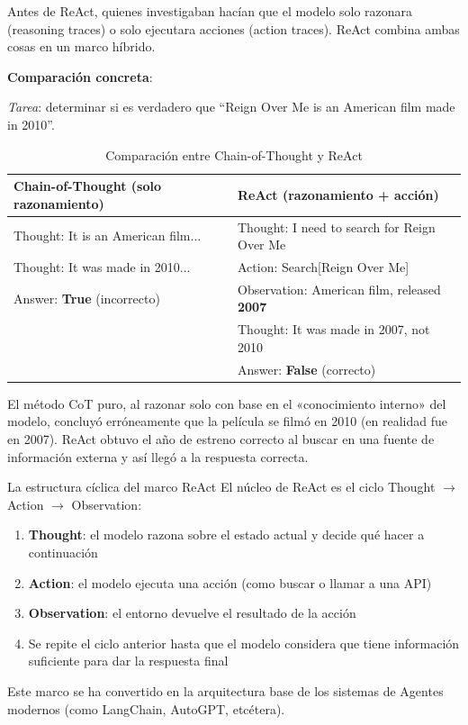 \documentclass[a4paper]{article}
\begin{document}
Antes de ReAct, quienes investigaban hacían que el modelo solo razonara (reasoning traces) o solo ejecutara acciones (action traces). ReAct combina ambas cosas en un marco híbrido.

\textbf{Comparación concreta}:

\textit{Tarea}: determinar si es verdadero que ``Reign Over Me is an American film made in 2010''.

\begin{table}[H]
\centering
\begin{tabular}{p{6cm}p{6cm}}
\toprule
\textbf{Chain-of-Thought (solo razonamiento)} & \textbf{ReAct (razonamiento + acción)} \\
\midrule
Thought: It is an American film... & Thought: I need to search for Reign Over Me \\
Thought: It was made in 2010... & Action: Search{[}Reign Over Me{]} \\
Answer: \textbf{True} {\color{red}(incorrecto)} & Observation: American film, released \textbf{2007} \\
 & Thought: It was made in 2007, not 2010 \\
 & Answer: \textbf{False} {\color{green!60!black}(correcto)} \\
\bottomrule
\end{tabular}
\caption{Comparación entre Chain-of-Thought y ReAct}
\end{table}

El método CoT puro, al razonar solo con base en el «conocimiento interno» del modelo, concluyó erróneamente que la película se filmó en 2010 (en realidad fue en 2007). ReAct obtuvo el año de estreno correcto al buscar en una fuente de información externa y así llegó a la respuesta correcta.

\begin{importantbox}{La estructura cíclica del marco ReAct}
El núcleo de ReAct es el ciclo Thought $\rightarrow$ Action $\rightarrow$ Observation:
\begin{enumerate}
    \item \textbf{Thought}: el modelo razona sobre el estado actual y decide qué hacer a continuación
    \item \textbf{Action}: el modelo ejecuta una acción (como buscar o llamar a una API)
    \item \textbf{Observation}: el entorno devuelve el resultado de la acción
    \item Se repite el ciclo anterior hasta que el modelo considera que tiene información suficiente para dar la respuesta final
\end{enumerate}
Este marco se ha convertido en la arquitectura base de los sistemas de Agentes modernos (como LangChain, AutoGPT, etcétera).
\end{importantbox}
\end{document}

